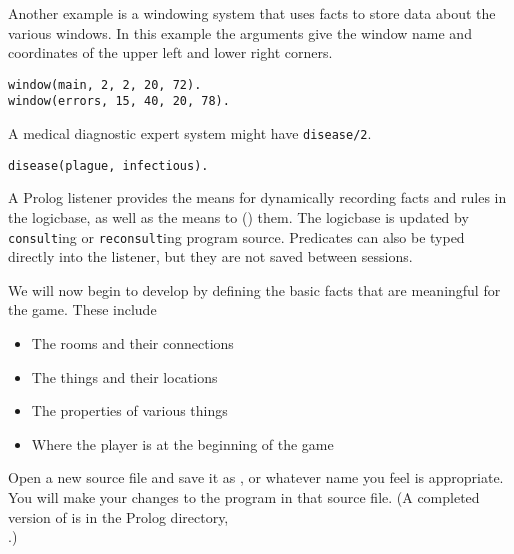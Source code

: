 Another example is a windowing system that uses facts to store data about the
various windows. In this example the arguments give the window name and
coordinates of the upper left and lower right corners.
\begin{verbatim}
window(main, 2, 2, 20, 72).
window(errors, 15, 40, 20, 78).
\end{verbatim}

A medical diagnostic expert system might have \verb'disease/2'.
\begin{verbatim}
disease(plague, infectious).
\end{verbatim}

A Prolog listener provides the means for dynamically recording facts and rules
in the logicbase, as well as the means to 
() them. The logicbase is updated by
\verb'consult'ing or \verb'reconsult'ing program source. Predicates can also be
typed directly into the listener, but they are not saved between sessions.


We will now begin to develop  by defining the basic facts that
are meaningful for the game. These include
\begin{itemize}[nosep]
  \item 
The rooms and their connections
  \item 
The things and their locations
  \item 
The properties of various things
  \item 
Where the player is at the beginning of the game
\end{itemize}

Open a new source file and save it as , or whatever name you feel
is appropriate. You will make your changes to the program in that source file.
(A completed version of  is in the Prolog 
directory,\\.)

\secup
